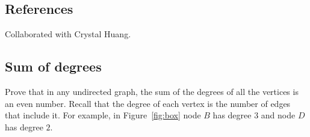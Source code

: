 \def\lc{\left\lceil}   
\def\rc{\right\rceil}
\runningheadrule
\firstpageheadrule
\cfoot{}
\subsection*{References}
Collaborated with Crystal Huang.
\subsection{Sum of degrees}
Prove that in any undirected graph, 
the sum of the degrees of all the vertices is an even number. Recall that the degree of each vertex is the number of edges that include it. For example, in Figure~\ref{fig:box} node $B$ has degree $3$ and node $D$ has degree $2$.

